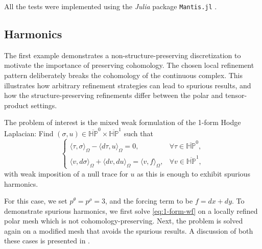 \documentclass[10pt]{article}
\newcommand{\vSpace}[1]{\mathbb{#1}}
\newcommand{\polar}{P}
\newcommand{\hSpace}[1]{\mathit{\vSpace{H}\vSpace{#1}}}
\theoremstyle{plain}
\theoremstyle{definition}
\theoremstyle{remark}
\begin{document}
All the tests were implemented using the \emph{Julia} package \texttt{Mantis.jl}
\cite{Cabanas:2026}.

\subsection{Harmonics}
\label{subsec:spurious-harmonics}

The first example demonstrates a non-structure-preserving discretization to motivate the
importance of preserving cohomology. 
The chosen local refinement pattern deliberately breaks the cohomology of the continuous
complex. This illustrates how arbitrary refinement strategies can lead to spurious results,
and how the structure-preserving refinements differ between the polar and tensor-product
settings.

The problem of interest is the mixed weak formulation of the 1-form Hodge Laplacian: Find
\((\sigma, u) \in \overline{\hSpace{\polar}}^0 \times \overline{\hSpace{\polar}}^1\) such
that 
\begin{equation}
    \label{eq:1-form-wf}
    \begin{cases}
        \langle \tau, \sigma\rangle_{\Omega} - \langle d\tau, u\rangle_{\Omega} = 0, &
    \forall \tau \in \overline{\hSpace{\polar}}^0, \\
    \langle v, d\sigma \rangle_{\Omega} + \langle dv,  du \rangle_{\Omega} =  \langle
        v, f \rangle_{\Omega}, & \forall v \in \overline{\hSpace{\polar}}^1,
    \end{cases}
\end{equation}
with weak imposition of a null trace for \(u\) as this is enough to exhibit spurious
harmonics.

For this case, we set \(p^\theta=p^\rho=3\), and the forcing term to be \(f=dx + dy\).
To demonstrate spurious harmonics, we first solve \eqref{eq:1-form-wf} on a locally
refined polar mesh which is not cohomology-preserving.
Next, the problem is solved again on a modified mesh that avoids the spurious results.
A discussion of both these cases is presented in .
\end{document}
